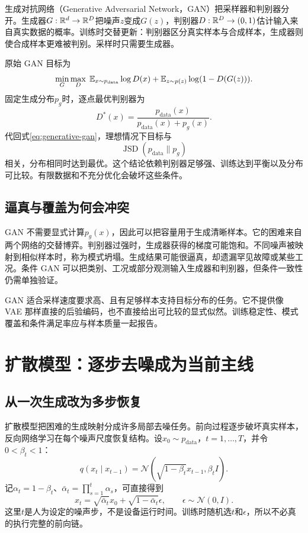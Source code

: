 生成对抗网络（Generative Adversarial Network，GAN）把采样器和判别器分开。生成器$G:\mathbb{R}^d\to\mathbb{R}^D$把噪声$z$变成$G(z)$，判别器$D:\mathbb{R}^D\to(0,1)$估计输入来自真实数据的概率。训练时交替更新：判别器区分真实样本与合成样本，生成器则使合成样本更难被判别。采样时只需要生成器。

原始 GAN 目标为
\begin{equation}
\min_G\max_D\;\mathbb{E}_{x\sim p_{\mathrm{data}}}\log D(x)+\mathbb{E}_{z\sim p(z)}\log(1-D(G(z))).
\label{eq:generative-gan}
\end{equation}
固定生成分布$p_g$时，逐点最优判别器为
\[
D^*(x)=\frac{p_{\mathrm{data}}(x)}{p_{\mathrm{data}}(x)+p_g(x)}.
\]
代回式\eqref{eq:generative-gan}，理想情况下目标与
\[
\operatorname{JSD}(p_{\mathrm{data}}\|p_g)
\]
相关，分布相同时达到最优。这个结论依赖判别器足够强、训练达到平衡以及分布可比较。有限数据和不充分优化会破坏这些条件。

\subsection{逼真与覆盖为何会冲突}

GAN 不需要显式计算$p_g(x)$，因此可以把容量用于生成清晰样本。它的困难来自两个网络的交替博弈。判别器过强时，生成器获得的梯度可能饱和。不同噪声被映射到相似样本时，称为模式坍塌。生成结果可能很逼真，却遗漏罕见故障或某些工况。条件 GAN 可以把类别、工况或部分观测输入生成器和判别器，但条件一致性仍需单独验证。

GAN 适合采样速度要求高、且有足够样本支持目标分布的任务。它不提供像 VAE 那样直接的后验编码，也不直接给出可比较的显式似然。训练稳定性、模式覆盖和条件满足率应与样本质量一起报告。

\section{扩散模型：逐步去噪成为当前主线}

\subsection{从一次生成改为多步恢复}

扩散模型把困难的生成映射分成许多局部去噪任务。前向过程逐步破坏真实样本，反向网络学习在每个噪声尺度恢复结构。设$x_0\sim p_{\mathrm{data}}$，$t=1,\ldots,T$，并令$0<\beta_t<1$：
\begin{equation}
q(x_t\mid x_{t-1})=\mathcal N(\sqrt{1-\beta_t}x_{t-1},\beta_tI).
\end{equation}
记$\alpha_t=1-\beta_t$、$\bar\alpha_t=\prod_{s=1}^t\alpha_s$，可直接得到
\begin{equation}
x_t=\sqrt{\bar\alpha_t}x_0+\sqrt{1-\bar\alpha_t}\epsilon,
\qquad \epsilon\sim\mathcal N(0,I).
\label{eq:generative-direct-noising}
\end{equation}
这里$t$是人为设定的噪声步，不是设备运行时间。训练时随机选$t$和$\epsilon$，所以不必真的执行完整的前向链。

